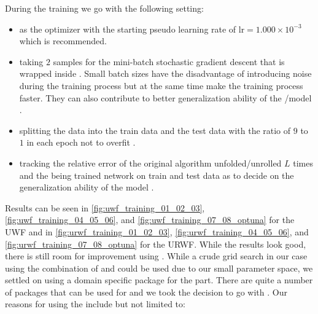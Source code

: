 During the training we go with the following setting:
\begin{itemize}
  \item \adam\cite{Kingma2014}\index{\adam} as the optimizer with the starting 
  pseudo learning rate of $\mathrm{lr}=1.000\times10^{-3}$ which is 
  recommended\cite{Kingma2014}\cite{Sun2019}.
  \item taking $2$\cite{Masters2018} samples for the mini-batch stochastic gradient descent 
  that is wrapped inside \adam\cite{Kingma2014}\index{\adam}. Small batch sizes have the 
  disadvantage of introducing noise during the training process but at the same time make 
  the training process faster. They can also contribute to better generalization ability 
  of the \ml/\dl model \cite{Masters2018}.
  \item splitting the data into the train data and the test data with the ratio of $9$ to $1$ 
  in each epoch  not to overfit \cite{Goodfellow2016}\cite{Chollet2023}.
  \item tracking the relative error of the original algorithm unfolded/unrolled $L$ times 
  and the being trained network on train and test data as to decide on the generalization ability of the model \cite{Goodfellow2016}\cite{Chollet2023}.
\end{itemize}
Results can be seen in \cref{fig:uwf_training_01_02_03}, \ref{fig:uwf_training_04_05_06}, and \ref{fig:uwf_training_07_08_optuna} for the 
\ac{UWF} and in \cref{fig:urwf_training_01_02_03}, \ref{fig:urwf_training_04_05_06}, and \ref{fig:urwf_training_07_08_optuna} 
for the \ac{URWF}. While the results look good, there is still room for improvement using \ho\cite{Hutter2019}\cite{Akiba2019}\index{\ho}. 
While a crude grid search in our case using the combination of \bash\cite{Ramey2022}\index{\bash} and \awk\cite{Robbins2023}\index{\awk}  could be used due to our small parameter space, we settled on 
using a domain specific package for the \ho\cite{Hutter2019}\cite{Akiba2019}\index{\ho} part. There are quite a number of packages that can be used for \ho\cite{Hutter2019}\cite{Akiba2019}\index{\ho} and we took the decision to go with 
\optuna\cite{Akiba2019}\index{\optuna}. Our reasons for using the \optuna\cite{Akiba2019}\index{\optuna} include but not limited to:
